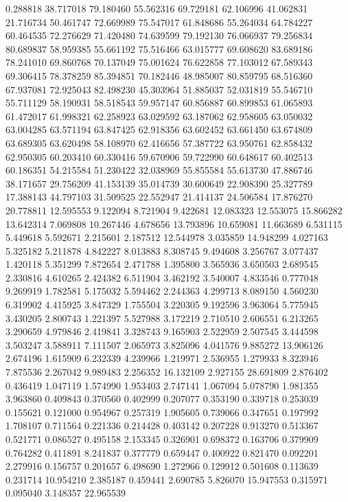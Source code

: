 0.288818
38.717018
79.180460
55.562316
69.729181
62.106996
41.062831
21.716734
50.461747
72.669989
75.547017
61.848686
55.264034
64.784227
60.464535
72.276629
71.420480
74.639599
79.192130
76.066937
79.256834
80.689837
58.959385
55.661192
75.516466
63.015777
69.608620
83.689186
78.241010
69.860768
70.137049
75.001624
76.622858
77.103012
67.589343
69.306415
78.378259
85.394851
70.182446
48.985007
80.859795
68.516360
67.937081
72.925043
82.498230
45.303964
51.885037
52.031819
55.546710
55.711129
58.190931
58.518543
59.957147
60.856887
60.899853
61.065893
61.472017
61.998321
62.258923
63.029592
63.187062
62.958605
63.050032
63.004285
63.571194
63.847425
62.918356
63.602452
63.661450
63.674809
63.689305
63.620498
58.108970
62.416656
57.387722
63.950761
62.858432
62.950305
60.203410
60.330416
59.670906
59.722990
60.648617
60.402513
60.186351
54.215584
51.230422
32.038969
55.855584
55.613730
47.886746
38.171657
29.756209
41.153139
35.014739
30.600649
22.908390
25.327789
17.388143
44.797103
31.509525
22.552947
21.414137
24.506584
17.876270
20.778811
12.595553
9.122094
8.721904
9.422681
12.083323
12.553075
15.866282
13.642314
7.069808
10.267446
4.678656
13.793896
10.659081
11.663689
6.531115
5.449618
5.592671
2.215601
2.187512
12.544978
3.035859
14.948299
4.027163
5.325182
5.211878
4.842227
8.013883
8.308745
9.494608
3.256767
3.077437
1.420118
5.351299
7.872654
2.471788
1.395800
3.565936
3.650503
2.689545
2.330816
4.610265
2.424382
6.511904
3.462192
3.540007
4.833546
0.777048
9.269919
1.782581
5.175032
5.594462
2.244363
4.299713
8.089150
4.560230
6.319902
4.415925
3.847329
1.755504
3.220305
9.192596
3.963064
5.775945
3.430205
2.800743
1.221397
5.527988
3.172219
2.710510
2.606551
6.213265
3.290659
4.979846
2.419841
3.328743
9.165903
2.522959
2.507545
3.444598
3.503247
3.588911
7.111507
2.065973
3.825096
4.041576
9.885272
13.906126
2.674196
1.615909
6.232339
4.239966
1.219971
2.536955
1.279933
8.323946
7.875536
2.267042
9.989483
2.256352
16.132109
2.927155
28.691809
2.876402
0.436419
1.047119
1.574990
1.953403
2.747141
1.067094
5.078790
1.981355
3.963860
0.409843
0.370560
0.402999
0.207077
0.353190
0.339718
0.253039
0.155621
0.121000
0.954967
0.257319
1.905605
0.739066
0.347651
0.197992
1.708107
0.711564
0.221336
0.214428
0.403142
0.207228
0.913270
0.513367
0.521771
0.086527
0.495158
2.153345
0.326901
0.698372
0.163706
0.379909
0.764282
0.411891
8.241837
0.377779
0.659447
0.400922
0.821470
0.092201
2.279916
0.156757
0.201657
6.498690
1.272966
0.129912
0.501608
0.113639
0.231714
10.954210
2.385187
0.459441
2.690785
5.826070
15.947553
0.315971
0.095040
3.148357
22.965539
